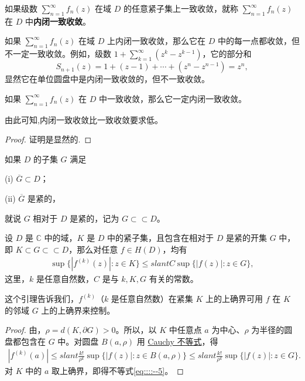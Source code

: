 \documentclass[../../main.tex]{subfiles}
\begin{document}
\begin{definition}
如果级数 \( \sum_{n=1}^{\infty} f_n(z) \) 在域 \( D \) 的任意紧子集上一致收敛，就称 \( \sum_{n=1}^{\infty} f_n(z) \) 在 \( D \) 中\textbf{内闭一致收敛}。
\end{definition}

\begin{remark}
如果 \( \sum_{n=1}^{\infty} f_n(z) \) 在域 \( D \) 上内闭一致收敛，那么它在 \( D \) 中的每一点都收敛，但不一定一致收敛。例如，级数 \( 1 + \sum_{k=1}^{\infty} (z^k - z^{k - 1}) \)，它的部分和
\[
S_{n + 1}(z) = 1 + (z - 1) + \cdots + (z^n - z^{n - 1}) = z^n,
\]
显然它在单位圆盘中是内闭一致收敛的，但不一致收敛。
\end{remark}

\begin{proposition}
如果 \( \sum_{n=1}^{\infty} f_n(z) \) 在 \( D \) 中一致收敛，那么它一定内闭一致收敛。
\end{proposition}
\begin{note}
由此可知,内闭一致收敛比一致收敛要求低。
\end{note}
\begin{proof}
证明是显然的.
\end{proof}

\begin{definition}
如果 \( D \) 的子集 \( G \) 满足

(i) \( \overline{G} \subset D \)；

(ii) \( \overline{G} \) 是紧的，

就说 \( G \) 相对于 \( D \) 是紧的，记为 \( G \subset\subset D \)。
\end{definition}

\begin{lemma}\label{lemma:引理4.1.8}
设 \( D \) 是 \( \mathbb{C} \) 中的域，\( K \) 是 \( D \) 中的紧子集，且包含在相对于 \( D \) 是紧的开集 \( G \) 中，即 \( K \subset G \subset\subset D \)，那么对任意 \( f \in H(D) \)，均有
\begin{align}
\sup\{|f^{(k)}(z)| : z \in K\} \leqslant slant C\sup\{|f(z)| : z \in G\},\label{eq::::--5}
\end{align}
这里，\( k \) 是任意自然数，\( C \) 是与 \( k, K, G \) 有关的常数。
\end{lemma}
\begin{note}
这个引理告诉我们，\( f^{(k)} \)（\( k \) 是任意自然数）在紧集 \( K \) 上的上确界可用 \( f \) 在 \( K \) 的邻域 \( G \) 上的上确界来控制。
\end{note}
\begin{proof}
由，\( \rho = d(K, \partial G) > 0 \)。所以，以 \( K \) 中任意点 \( a \) 为中心、\( \rho \) 为半径的圆盘都包含在 \( G \) 中。对圆盘 \( B(a, \rho) \) 用 \hyperref[theorem:Cauchy不等式-复变函数]{Cauchy 不等式}，得
\begin{align*}
|f^{(k)}(a)| \leqslant slant \frac{k!}{\rho^k}\sup\{|f(z)| : z \in B(a, \rho)\} \leqslant slant \frac{k!}{\rho^k}\sup\{|f(z)| : z \in G\}.
\end{align*}
对 \( K \) 中的 \( a \) 取上确界，即得不等式\eqref{eq::::--5}。
\end{proof}
\end{document}
